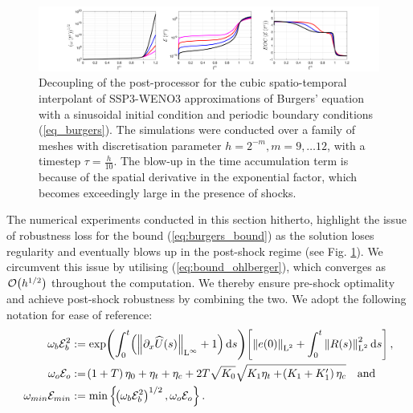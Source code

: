 \documentclass[final]{amsart}
\numberwithin{equation}{section}
\begin{document}
\begin{figure}[H]	
		\includegraphics[width=\textwidth]{../figures/fig_SSP3WENO3_postshockplots_1x5_sin_IC_burgers_decoupled}	
	\caption{\label{fig:SSP3WENO_burgers_decoupled}  Decoupling of the post-processor for the cubic spatio-temporal  interpolant of SSP3-WENO3
		approximations of Burgers' equation with a sinusoidal initial condition and periodic boundary conditions
		(\ref{eq_burgers}).  The simulations were conducted over a family of
		meshes with discretisation parameter $h = 2^{-m}, m = 9,\dots 12$,
		with a timestep $\tau = \tfrac{h}{10}$. The blow-up in the time accumulation term is because of the spatial derivative in the exponential factor, which becomes exceedingly large in the presence of shocks. }
\end{figure}


The numerical experiments conducted in this section hitherto, highlight the issue of robustness loss for the bound  (\ref{eq:burgers_bound}) as the solution loses regularity and eventually blows up in the post-shock regime (see Fig. \ref{fig:SSP3WENO_burgers_decoupled}).  We circumvent this issue by  utilising (\ref{eq:bound_ohlberger}), which converges as $\mathcal{O}\!\left({h^{1/2}}\right)$ throughout the computation.  We thereby ensure pre-shock optimality and achieve post-shock robustness by combining the two.  We adopt the following notation for ease of reference:
\begin{equation}
	\begin{aligned}
		\w_b\mathcal{E}_b^2
		&:=
		\exp\qp{\int_0^t\qp{\Norm{\partial_x\widehat{U}\qp{s}}_{\leb{\infty}}+1}\mathrm{d}s}\qb{\Norm{e\qp{0}}_{\leb{2}}+\int_0^t\Norm{R\qp{s}}^2_{\leb{2}}\mathrm{d}s}
		,\\
		\w_o\mathcal{E}_o
		&:=
		\qp{1+T}\eta_0 
		+
		\eta_t
		+
		\eta_c
		+
		2T\sqrt{K_0}\sqrt{K_1\eta_t+\qp{K_1+K_1'}\eta_c}
		\quad\text{and}\\
		\w_{min}\mathcal{E}_{min}&:=\min\bracegs{\qp{\w_b\mathcal{E}_b^2}^{1/2}, \w_o\mathcal{E}_o}.
	\end{aligned}
\end{equation}
\end{document}
